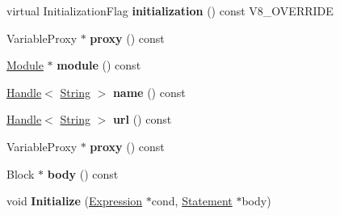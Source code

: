 \begin{DoxyCompactItemize}
\item 
\hypertarget{classv8_1_1internal_1_1_v8___f_i_n_a_l_afbb087b357518cacddd56af73b937289}{}virtual Initialization\+Flag {\bfseries initialization} () const V8\+\_\+\+O\+V\+E\+R\+R\+I\+D\+E\label{classv8_1_1internal_1_1_v8___f_i_n_a_l_afbb087b357518cacddd56af73b937289}

\item 
\hypertarget{classv8_1_1internal_1_1_v8___f_i_n_a_l_a96fed15dc67bc3264564680f40eba9f2}{}Variable\+Proxy $\ast$ {\bfseries proxy} () const \label{classv8_1_1internal_1_1_v8___f_i_n_a_l_a96fed15dc67bc3264564680f40eba9f2}

\item 
\hypertarget{classv8_1_1internal_1_1_v8___f_i_n_a_l_a203b6ba6c5d0e204c935803f872f4f49}{}\hyperlink{classv8_1_1internal_1_1_module}{Module} $\ast$ {\bfseries module} () const \label{classv8_1_1internal_1_1_v8___f_i_n_a_l_a203b6ba6c5d0e204c935803f872f4f49}

\item 
\hypertarget{classv8_1_1internal_1_1_v8___f_i_n_a_l_ae093884f144601c733c3c49b3af199b4}{}\hyperlink{classv8_1_1internal_1_1_handle}{Handle}$<$ \hyperlink{classv8_1_1internal_1_1_string}{String} $>$ {\bfseries name} () const \label{classv8_1_1internal_1_1_v8___f_i_n_a_l_ae093884f144601c733c3c49b3af199b4}

\item 
\hypertarget{classv8_1_1internal_1_1_v8___f_i_n_a_l_aa5908b9acc1a3c5bec825a1f1da6a1c0}{}\hyperlink{classv8_1_1internal_1_1_handle}{Handle}$<$ \hyperlink{classv8_1_1internal_1_1_string}{String} $>$ {\bfseries url} () const \label{classv8_1_1internal_1_1_v8___f_i_n_a_l_aa5908b9acc1a3c5bec825a1f1da6a1c0}

\item 
\hypertarget{classv8_1_1internal_1_1_v8___f_i_n_a_l_a96fed15dc67bc3264564680f40eba9f2}{}Variable\+Proxy $\ast$ {\bfseries proxy} () const \label{classv8_1_1internal_1_1_v8___f_i_n_a_l_a96fed15dc67bc3264564680f40eba9f2}

\item 
\hypertarget{classv8_1_1internal_1_1_v8___f_i_n_a_l_a303d18731710bb9ecd0809f2852e6910}{}Block $\ast$ {\bfseries body} () const \label{classv8_1_1internal_1_1_v8___f_i_n_a_l_a303d18731710bb9ecd0809f2852e6910}

\item 
\hypertarget{classv8_1_1internal_1_1_v8___f_i_n_a_l_a6f5890f56adee9fb20edd4007f5659ae}{}void {\bfseries Initialize} (\hyperlink{classv8_1_1internal_1_1_expression}{Expression} $\ast$cond, \hyperlink{classv8_1_1internal_1_1_statement}{Statement} $\ast$body)\label{classv8_1_1internal_1_1_v8___f_i_n_a_l_a6f5890f56adee9fb20edd4007f5659ae}


\end{DoxyCompactItemize}
